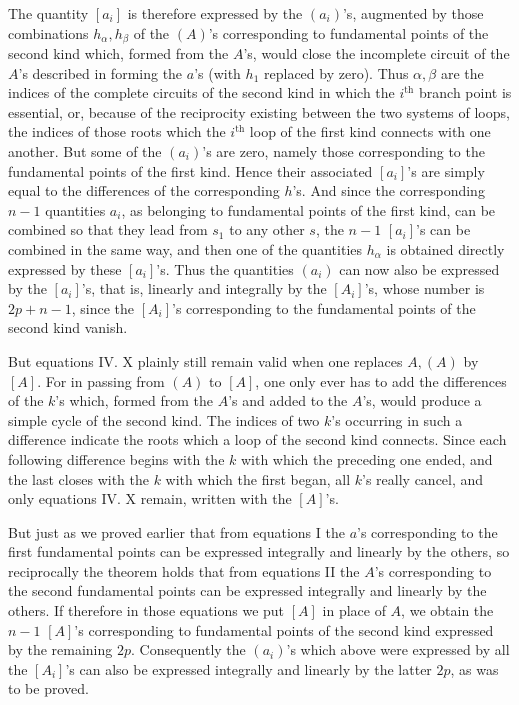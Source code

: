 \documentclass[10pt]{article}
\begin{document}
The quantity \([a_i]\) is therefore expressed by the \((a_i)\)'s, augmented by those combinations \(h_{\alpha},h_{\beta}\) of the \((A)\)'s corresponding to fundamental points of the second kind which, formed from the \(A\)'s, would close the incomplete circuit of the \(A\)'s described in forming the \(a\)'s (with \(h_1\) replaced by zero). Thus \(\alpha,\beta\) are the indices of the complete circuits of the second kind in which the \(i^{\text{th}}\) branch point is essential, or, because of the reciprocity existing between the two systems of loops, the indices of those roots which the \(i^{\text{th}}\) loop of the first kind connects with one another. But some of the \((a_i)\)'s are zero, namely those corresponding to the fundamental points of the first kind. Hence their associated \([a_i]\)'s are simply equal to the differences of the corresponding \(h\)'s. And since the corresponding \(n-1\) quantities \(a_i\), as belonging to fundamental points of the first kind, can be combined so that they lead from \(s_1\) to any other \(s\), the \(n-1\) \([a_i]\)'s can be combined in the same way, and then one of the quantities \(h_{\alpha}\) is obtained directly expressed by these \([a_i]\)'s. Thus the quantities \((a_i)\) can now also be expressed by the \([a_i]\)'s, that is, linearly and integrally by the \([A_i]\)'s, whose number is \(2p+n-1\), since the \([A_i]\)'s corresponding to the fundamental points of the second kind vanish.

But equations IV. X plainly still remain valid when one replaces \(A,(A)\) by \([A]\). For in passing from \((A)\) to \([A]\), one only ever has to add the differences of the \(k\)'s which, formed from the \(A\)'s and added to the \(A\)'s, would produce a simple cycle of the second kind. The indices of two \(k\)'s occurring in such a difference indicate the roots which a loop of the second kind connects. Since each following difference begins with the \(k\) with which the preceding one ended, and the last closes with the \(k\) with which the first began, all \(k\)'s really cancel, and only equations IV. X remain, written with the \([A]\)'s.

But just as we proved earlier that from equations I the \(a\)'s corresponding to the first fundamental points can be expressed integrally and linearly by the others, so reciprocally the theorem holds that from equations II the \(A\)'s corresponding to the second fundamental points can be expressed integrally and linearly by the others. If therefore in those equations we put \([A]\) in place of \(A\), we obtain the \(n-1\) \([A]\)'s corresponding to fundamental points of the second kind expressed by the remaining \(2p\). Consequently the \((a_i)\)'s which above were expressed by all the \([A_i]\)'s can also be expressed integrally and linearly by the latter \(2p\), as was to be proved.
\end{document}
